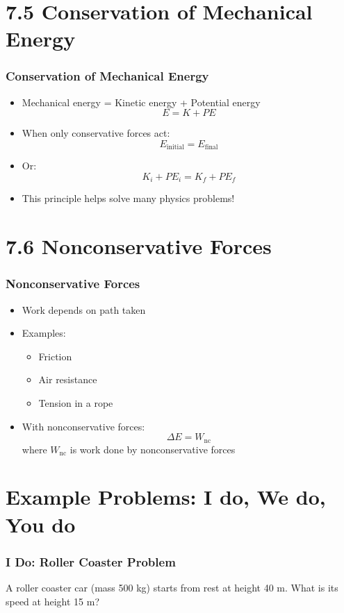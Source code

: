 \documentclass{beamer}
\begin{document}
\section{7.5 Conservation of Mechanical Energy}

\begin{frame}
\frametitle{Conservation of Mechanical Energy}
\begin{itemize}
    \item Mechanical energy = Kinetic energy + Potential energy
    \[E = K + PE\]
    \item When only conservative forces act:
    \[E_{\text{initial}} = E_{\text{final}}\]
    \item Or:
    \[K_i + PE_i = K_f + PE_f\]
    \item This principle helps solve many physics problems!
\end{itemize}
\end{frame}

\section{7.6 Nonconservative Forces}

\begin{frame}
\frametitle{Nonconservative Forces}
\begin{itemize}
    \item Work depends on path taken
    \item Examples:
    \begin{itemize}
        \item Friction
        \item Air resistance
        \item Tension in a rope
    \end{itemize}
    \item With nonconservative forces:
    \[\Delta E = W_{\text{nc}}\]
    where $W_{\text{nc}}$ is work done by nonconservative forces
\end{itemize}
\end{frame}

\section{Example Problems: I do, We do, You do}

\begin{frame}
\frametitle{I Do: Roller Coaster Problem}
A roller coaster car (mass 500 kg) starts from rest at height 40 m. What is its speed at height 15 m?
\end{frame}
\end{document}
